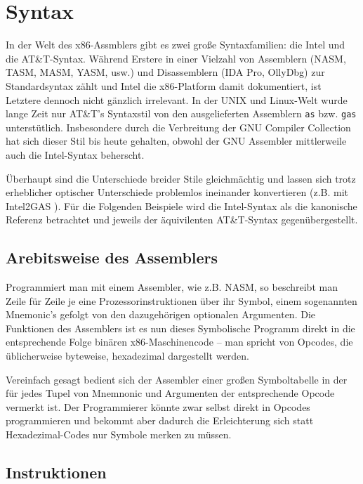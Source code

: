 \section{Syntax}

In der Welt des x86-Assmblers gibt es zwei große Syntaxfamilien: die Intel und
die AT\&T-Syntax. Während Erstere in einer Vielzahl von Assemblern (NASM, TASM,
MASM, YASM, usw.) und Disassemblern (IDA Pro, OllyDbg) zur Standardsyntax zählt
und Intel die x86-Platform damit dokumentiert, ist Letztere dennoch nicht
gänzlich irrelevant. In der UNIX und Linux-Welt wurde lange Zeit nur AT\&T's
Syntaxstil von den ausgelieferten Assemblern \texttt{as} bzw. \texttt{gas}
unterstütlich. Insbesondere durch die Verbreitung der GNU Compiler Collection
hat sich dieser Stil bis heute gehalten, obwohl der GNU Assembler mittlerweile
auch die Intel-Syntax beherscht.

Überhaupt sind die Unterschiede breider Stile gleichmächtig und lassen sich
trotz erheblicher optischer Unterschiede problemlos ineinander konvertieren
(z.B. mit Intel2GAS \cite{i2g}). Für die Folgenden Beispiele wird die
Intel-Syntax als die kanonische Referenz betrachtet und jeweils der
äquivilenten AT\&T-Syntax gegenübergestellt.


\subsection{Arebitsweise des Assemblers}

Programmiert man mit einem Assembler, wie z.B. NASM, so beschreibt man Zeile
für Zeile je eine Prozessorinstruktionen über ihr Symbol, einem sogenannten
Mnemonic's gefolgt von den dazugehörigen optionalen Argumenten. Die Funktionen
des Assemblers ist es nun dieses Symbolische Programm direkt in die
entsprechende Folge binären x86-Maschinencode – man spricht von Opcodes, die
üblicherweise byteweise, hexadezimal dargestellt werden.

Vereinfach gesagt bedient sich der Assembler einer großen Symboltabelle in der
für jedes Tupel von Mnemnonic und Argumenten der entsprechende Opcode vermerkt
ist. Der Programmierer könnte zwar selbst direkt in Opcodes programmieren und
bekommt aber dadurch die Erleichterung sich statt Hexadezimal-Codes nur Symbole
merken zu müssen.

\subsection{Instruktionen}


